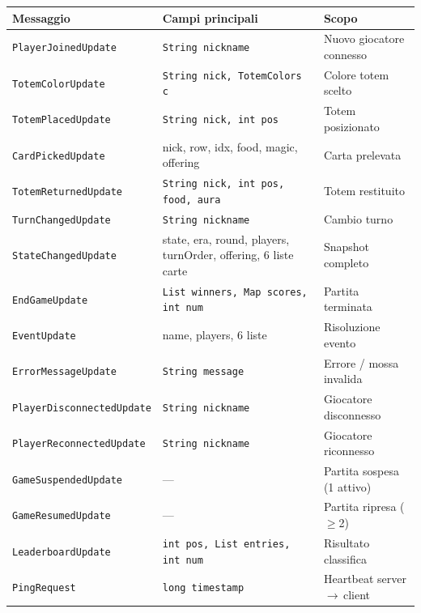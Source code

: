\documentclass[a4paper,12pt]{article}
\newcommand{\code}[1]{\texttt{#1}}
\begin{document}
\begin{small}
\begin{tabularx}{\textwidth}{@{}lp{5cm}X@{}}
\toprule
\textbf{Messaggio} & \textbf{Campi principali} & \textbf{Scopo} \\
\midrule
\code{PlayerJoinedUpdate}       & \code{String nickname}               & Nuovo giocatore connesso \\
\code{TotemColorUpdate}         & \code{String nick, TotemColors c}    & Colore totem scelto \\
\code{TotemPlacedUpdate}        & \code{String nick, int pos}          & Totem posizionato \\
\code{CardPickedUpdate}         & nick, row, idx, food, magic, offering & Carta prelevata \\
\code{TotemReturnedUpdate}      & \code{String nick, int pos, food, aura} & Totem restituito \\
\code{TurnChangedUpdate}        & \code{String nickname}               & Cambio turno \\
\code{StateChangedUpdate}       & state, era, round, players, turnOrder, offering, 6 liste carte & Snapshot completo \\
\code{EndGameUpdate}            & \code{List winners, Map scores, int num} & Partita terminata \\
\code{EventUpdate}              & name, players, 6 liste               & Risoluzione evento \\
\code{ErrorMessageUpdate}       & \code{String message}                & Errore / mossa invalida \\
\code{PlayerDisconnectedUpdate} & \code{String nickname}               & Giocatore disconnesso \\
\code{PlayerReconnectedUpdate}  & \code{String nickname}               & Giocatore riconnesso \\
\code{GameSuspendedUpdate}      & ---                                  & Partita sospesa (1 attivo) \\
\code{GameResumedUpdate}        & ---                                  & Partita ripresa (\(\geq\)2) \\
\code{LeaderboardUpdate}        & \code{int pos, List entries, int num} & Risultato classifica \\
\code{PingRequest}              & \code{long timestamp}                & Heartbeat server\,$\to$\,client \\
\bottomrule
\end{tabularx}
\end{small}
\end{document}
